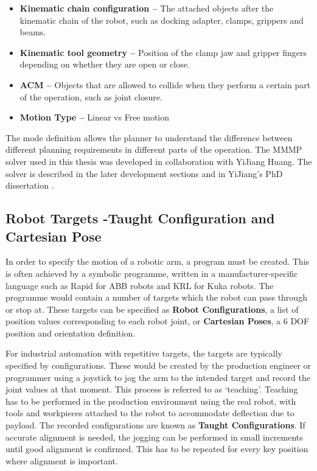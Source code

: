\begin{itemize}
	\item \textbf{Kinematic chain configuration --} The attached objects after the kinematic chain of the robot, such as docking adapter, clamps, grippers and beams.
	\item \textbf{Kinematic tool geometry --} Position of the clamp jaw and gripper fingers depending on whether they are open or close.
	\item \textbf{ACM --} Objects that are allowed to collide when they perform a certain part of the operation, such as joint closure.
	\item \textbf{Motion Type --} Linear vs Free motion
\end{itemize}

The mode definition allows the planner to understand the difference between different planning requirements in different parts of the operation. The MMMP solver used in this thesis was developed in collaboration with YiJiang Huang. The solver is described in the later development sections  and in YiJiang’s PhD dissertation \parencite{huangAlgorithmicPlanningRobotic2022}.

\subsection{Robot Targets -Taught Configuration and Cartesian Pose}
\label{subsection:exploration-3-robot-targets-taught-configuration-and-cartesian-pose}

In order to specify the motion of a robotic arm, a program must be created. This is often achieved by a symbolic programme, written in a manufacturer-specific language such as Rapid for ABB robots and KRL for Kuka robots. The programme would contain a number of targets which the robot can pass through or stop at. These targets can be specified as \textbf{Robot Configurations}, a list of position values corresponding to each robot joint, or \textbf{Cartesian Poses}, a 6 DOF position and orientation definition.

For industrial automation with repetitive targets, the targets are typically specified by configurations. These would be created by the production engineer or programmer using a joystick to jog the arm to the intended target and record the joint values at that moment. This process is referred to as ‘teaching’. Teaching has to be performed in the production environment using the real robot, with tools and workpieces attached to the robot to accommodate deflection due to payload. The recorded configurations are known as \textbf{Taught Configurations}. If accurate alignment is needed, the jogging can be performed in small increments until good alignment is confirmed. This has to be repeated for every key position where alignment is important.

